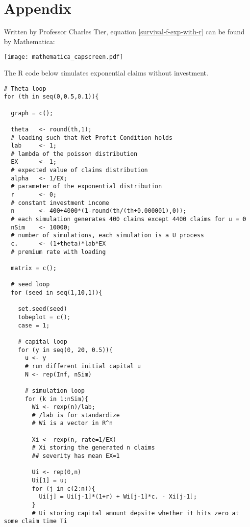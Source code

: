 \documentclass[12pt]{article}
\begin{document}

\newpage
\section{Appendix}
Written by Professor Charles Tier, equation \eqref{survival-f-exp-with-r} can be found by Mathematica\cite{ref04}:\\
\vskip 0.5cm
\begin{flushleft}
\texttt{[image: mathematica\_capscreen.pdf]}
\end{flushleft}

\newpage
The R code below simulates exponential claims without investment.
\begin{lstlisting}
# Theta loop
for (th in seq(0,0.5,0.1)){

  graph = c();
  
  theta   <- round(th,1);      
  # loading such that Net Profit Condition holds
  lab     <- 1;                
  # lambda of the poisson distribution
  EX      <- 1;                
  # expected value of claims distribution
  alpha   <- 1/EX;
  # parameter of the exponential distribution
  r       <- 0;                
  # constant investment income
  n       <- 400+4000*(1-round(th/(th+0.000001),0));
  # each simulation generates 400 claims except 4400 claims for u = 0
  nSim    <- 10000;            
  # number of simulations, each simulation is a U process
  c.      <- (1+theta)*lab*EX  
  # premium rate with loading
  
  matrix = c();
  
  # seed loop
  for (seed in seq(1,10,1)){
    
    set.seed(seed)
    tobeplot = c();
    case = 1;
    
    # capital loop
    for (y in seq(0, 20, 0.5)){
      u <- y
      # run different initial capital u
      N <- rep(Inf, nSim)
      
      # simulation loop
      for (k in 1:nSim){
        Wi <- rexp(n)/lab; 
        # /lab is for standardize
        # Wi is a vector in R^n
        
        Xi <- rexp(n, rate=1/EX)
        # Xi storing the generated n claims
        ## severity has mean EX=1
        
        Ui <- rep(0,n)
        Ui[1] = u;
        for (j in c(2:n)){
          Ui[j] = Ui[j-1]*(1+r) + Wi[j-1]*c. - Xi[j-1];
        }
        # Ui storing capital amount depsite whether it hits zero at some claim time Ti
        

\end{lstlisting}
\end{document}
